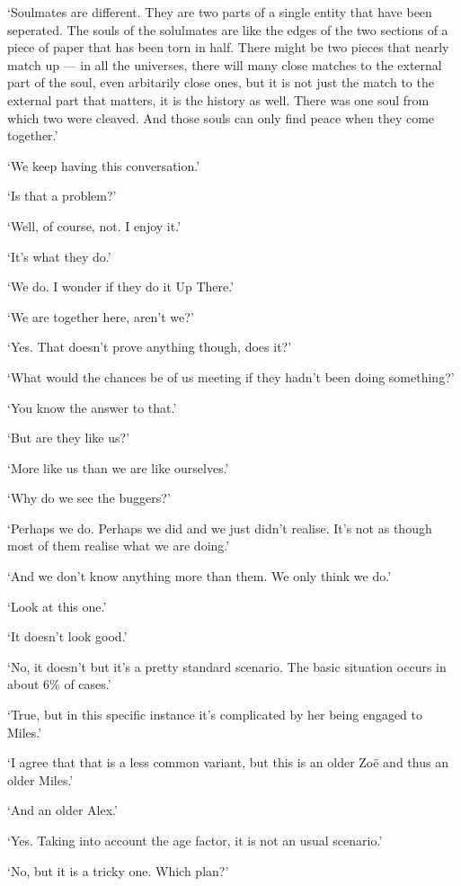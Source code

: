 `Soulmates are different. They are two parts of a single entity that have been seperated. The souls of the solulmates are like the edges of the two sections of a piece of paper that has been torn in half. There might be two pieces that nearly match up --- in all the universes, there will many close matches to the external part of the soul, even arbitarily close ones, but it is not just the match to the external part that matters, it is the history as well. There was one soul from which two were cleaved. And those souls can only find peace when they come together.'

`We keep having this conversation.'

`Is that a problem?'

`Well, of course, not. I enjoy it.'

`It's what they do.'

`{\twelveit We\/} do. I wonder if they do it Up There.'

`We are together here, aren't we?'

`Yes. That doesn't prove anything though, does it?'

`What would the chances be of us meeting if they hadn't been doing something?'

`You know the answer to that.'

`But are they like us?'

`More like us than we are like ourselves.'

`Why do we see the buggers?'

`Perhaps we do. Perhaps we did and we just didn't realise. It's not as though most of {\twelveit them\/} realise what {\twelveit we\/} are doing.'

`And we don't know anything more than them. We only think we do.'

`Look at this one.'

`It doesn't look good.'

`No, it doesn't but it's a pretty standard scenario. The basic situation occurs in about 6\% of cases.'

`True, but in this specific instance it's complicated by her being engaged to Miles.'

`I agree that that is a less common variant, but this is an older Zoë and thus an older Miles.'

`And an older Alex.'

`Yes. Taking into account the age factor, it is not an usual scenario.'

`No, but it is a tricky one. Which plan?'

